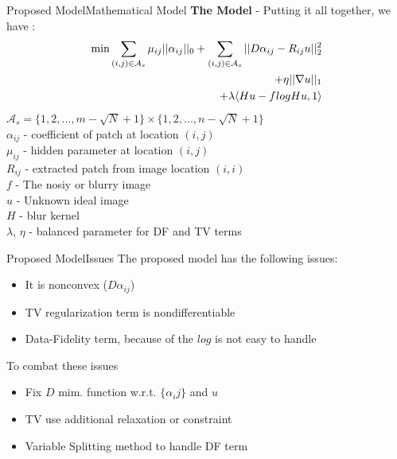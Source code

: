\documentclass{beamer}
\begin{document}
\begin{frame}[t]{Proposed Model}{Mathematical Model}
\textbf{The Model} - Putting it all together, we have :
\begin{equation}
\begin{aligned}
    \min \sum_{(i,j) \in \mathcal{A}_s}{} \mu_{ij}||\alpha_{ij}||_0 + \sum_{(i,j) \in \mathcal{A}_s}{} ||D\alpha_{ij} - R_{ij}u||^2_2 \\  
    + \eta ||\nabla u||_1 \\ 
    + \lambda\langle Hu-f\hspace{0.25pt}log Hu,1\rangle
\end{aligned}
\end{equation}
\vspace{5pt}
\footnotesize{
$\mathcal{A}_s=\{1,2,...,m-\sqrt{N}+1\}\times\{1,2,...,n-\sqrt{N}+1\}$ \\
$\alpha_{ij}$ - coefficient of patch at location $(i,j)$ \\ 
$\mu_{ij}$ - hidden parameter at location $(i,j)$\\
$R_{ij}$ - extracted patch from image location $(i,i)$  \\
$f$ - The nosiy or blurry image \\
$u$ - Unknown ideal image \\
$H$ - blur kernel\\ 
$\lambda$, $\eta$ - balanced parameter for DF and TV terms 
}

\end{frame}


\begin{frame}{Proposed Model}{Issues}
The proposed model has the following issues:
\begin{itemize}
    \item It is nonconvex ($D\alpha_{ij}$)
    \item TV regularization term is nondifferentiable
    \item Data-Fidelity term, because of the $log$ is not easy to handle
\end{itemize}
To combat these issues
\begin{itemize}
    \item Fix $D$ mim. function w.r.t. $\{\alpha_ij\}$ and $u$
    \item TV use additional relaxation or constraint 
    \item Variable Splitting method to handle DF term
\end{itemize}
\end{frame}
\end{document}
